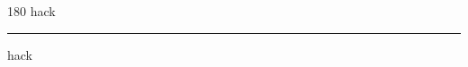 
\begin{frame}
\begin{center}
\begin{turn}{180}
{\fontsize{2.5cm}{1em}\selectfont hack}
\end{turn}
\vspace{1em}\par  
\hrule
\vspace{1em}\par  
{\fontsize{2.5cm}{1em}\selectfont hack}
\end{center}
\end{frame}
